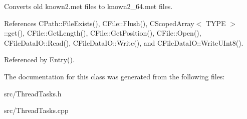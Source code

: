 Converts old known2.met files to known2\_\-64.met files. 

References CPath::FileExists(), CFile::Flush(), CScopedArray$<$ TYPE $>$::get(), CFile::GetLength(), CFile::GetPosition(), CFile::Open(), CFileDataIO::Read(), CFileDataIO::Write(), and CFileDataIO::WriteUInt8().

Referenced by Entry().

The documentation for this class was generated from the following files:\begin{DoxyCompactItemize}
\item 
src/ThreadTasks.h\item 
src/ThreadTasks.cpp\end{DoxyCompactItemize}
